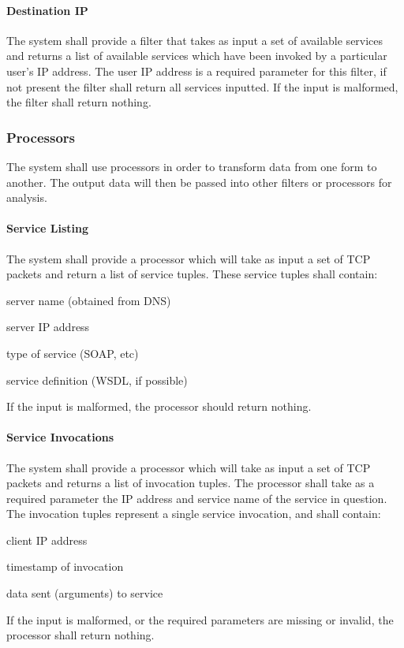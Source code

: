 \documentclass[titlepage]{article}
\begin{document}
\paragraph{Destination IP}

The system shall provide a filter that takes as input a set of available
services and returns a list of available services which have been invoked by a
particular user's IP address.  The user IP address is a required parameter for
this filter, if not present the filter shall return all services inputted.  If
the input is malformed, the filter shall return nothing.


\subsubsection{Processors}

The system shall use processors in order to transform data from one
form to another.  The output data will then be passed into other filters or
processors for analysis.

\paragraph{Service Listing}

The system shall provide a processor which will take as input a set of TCP
packets and return a list of service tuples.  These service tuples shall
contain:
\begin{itemize*}
    \item server name (obtained from DNS)
    \item server IP address
    \item type of service (SOAP, etc)
    \item service definition (WSDL, if possible)
\end{itemize*}
If the input is malformed, the processor should return nothing.

\paragraph{Service Invocations}

The system shall provide a processor which will take as input a set of TCP
packets and returns a list of invocation tuples.  The processor shall take as a
required parameter the IP address and service name of the service in question.
The invocation tuples represent a single service invocation, and shall contain:
\begin{itemize*}
    \item client IP address
    \item timestamp of invocation
    \item data sent (arguments) to service
\end{itemize*}
If the input is malformed, or the required parameters are missing or invalid,
the processor shall return nothing.
\end{document}
